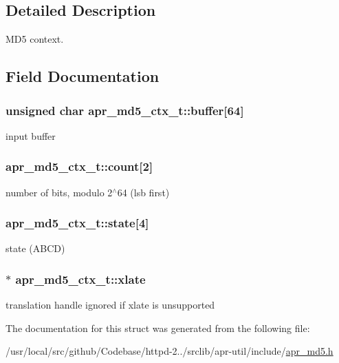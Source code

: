 \subsection{Detailed Description}
M\+D5 context. 

\subsection{Field Documentation}
\subsubsection[{\texorpdfstring{buffer}{buffer}}]{\setlength{\rightskip}{0pt plus 5cm}unsigned char apr\+\_\+md5\+\_\+ctx\+\_\+t\+::buffer\mbox{[}64\mbox{]}}\hypertarget{structapr__md5__ctx__t_aed43a8aefc65c8973dbae804c94ad1e3}{}\label{structapr__md5__ctx__t_aed43a8aefc65c8973dbae804c94ad1e3}
input buffer 
\subsubsection[{\texorpdfstring{count}{count}}]{ apr\+\_\+md5\+\_\+ctx\+\_\+t\+::count\mbox{[}2\mbox{]}}\hypertarget{structapr__md5__ctx__t_a3234a76e68a4ef546026a9854f9ba6d0}{}\label{structapr__md5__ctx__t_a3234a76e68a4ef546026a9854f9ba6d0}
number of bits, modulo 2$^\wedge$64 (lsb first) 
\subsubsection[{\texorpdfstring{state}{state}}]{ apr\+\_\+md5\+\_\+ctx\+\_\+t\+::state\mbox{[}4\mbox{]}}\hypertarget{structapr__md5__ctx__t_ab8acbc6cd7a3dcd16e66e64a7f5357b5}{}\label{structapr__md5__ctx__t_ab8acbc6cd7a3dcd16e66e64a7f5357b5}
state (A\+B\+CD) 
\subsubsection[{\texorpdfstring{xlate}{xlate}}]{$\ast$ apr\+\_\+md5\+\_\+ctx\+\_\+t\+::xlate}\hypertarget{structapr__md5__ctx__t_a391a62bc9e7fada71d03f786df4f49ba}{}\label{structapr__md5__ctx__t_a391a62bc9e7fada71d03f786df4f49ba}
translation handle ignored if xlate is unsupported 

The documentation for this struct was generated from the following file\+:\begin{DoxyCompactItemize}
\item 
/usr/local/src/github/\+Codebase/httpd-\/2../srclib/apr-\/util/include/\hyperlink{apr__md5_8h}{apr\+\_\+md5.\+h}\end{DoxyCompactItemize}
